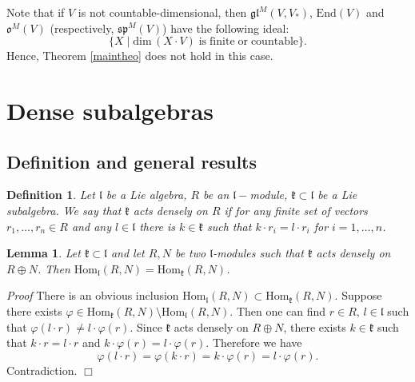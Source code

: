\documentclass{svmult}
\newtheorem{lem}[theo]{Lemma}
\renewenvironment{proof}{ \emph{Proof}}{$\Box$}
\newtheorem{defi}[theo]{Definition}
\renewcommand{\sp}{\mathfrak{sp}}
\newcommand{\kk}{\mathfrak{k}}
\newcommand{\oo}{\mathfrak{o}}
\renewcommand{\ll}{\mathfrak{l}}
\renewcommand {\phi} {\varphi}
\newcommand{\gl}{\mathfrak{gl}}
\newcommand{\Hom}{\mathrm{Hom}}
\newcommand{\End}{\mathrm{End}}
\begin{document}
Note that if $V$ is not countable-dimensional, then $\gl^M(V,V_*)$, $\End(V)$ and  $\oo^M(V)$ (respectively, $\sp^M(V)$)  have the following ideal:
\begin{equation}\label{ideal}
\lbrace X \;|\; \mathrm{dim}\,(X\cdot V) \mathrm{\;is\;finite\;or\;countable}\rbrace.\nonumber
\end{equation}
Hence, Theorem \ref{maintheo} does not hold in this case.

\vspace{0.33cm}

\section{Dense subalgebras}\label{sect:7}
\subsection {Definition and general results}\label{sect:7.1}
\begin{defi}\label{dense_salg}Let $\ll$ be a Lie algebra, $R$ be an $\ll-$module, $\kk\subset \ll$ be a Lie subalgebra. We say that $\kk$ acts \textit{densely}
on $R$ if for any finite set of vectors $r_1,\dots,r_n \in R$ and any $l\in \ll$ there is $k\in\kk$ such that $k\cdot r_i = l\cdot r_i$ for $i=1,\dots,n$.
\end{defi}

\begin{lem}\label{denshom}  Let $\kk\subset\ll$ and let $R,N$ be two $\ll$-modules such that $\kk$ acts densely on $R\oplus N$. Then 
$\Hom_\ll(R,N)=\Hom_\kk(R,N)$.
\end{lem}

\begin{proof} There is an obvious inclusion  $\Hom_\ll(R,N)\subset\Hom_\kk(R,N)$. Suppose there exists $\varphi\in \Hom_\kk(R,N)\setminus \Hom_\ll(R,N)$.
Then one can find $r\in R$, $l\in\ll$ such that $\varphi(l\cdot r)\neq l\cdot \phi(r)$. Since $\kk$ acts densely on $R \oplus N$,
there exists $k\in\kk$ such that $k \cdot r = l \cdot r$ and $k \cdot \varphi(r) = l \cdot \varphi (r)$.
Therefore we have
$$\phi(l \cdot r)=\varphi(k \cdot r)= k \cdot \phi(r) = l \cdot \phi(r).$$
Contradiction.
\end{proof}
\end{document}
